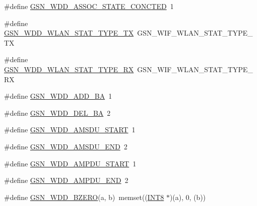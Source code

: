 \begin{DoxyCompactItemize}
\#define \hyperlink{a00603_af6d374ed7ee7ba0272cf307e24b1042d}{GSN\_\-WDD\_\-ASSOC\_\-STATE\_\-CONCTED}~1
\item 
\#define \hyperlink{a00603_a8487e8e5eda472ed8392357a081358f2}{GSN\_\-WDD\_\-WLAN\_\-STAT\_\-TYPE\_\-TX}~GSN\_\-WIF\_\-WLAN\_\-STAT\_\-TYPE\_\-TX
\item 
\#define \hyperlink{a00603_a3a8f4b4eca7723415ea145f12e4e2dbd}{GSN\_\-WDD\_\-WLAN\_\-STAT\_\-TYPE\_\-RX}~GSN\_\-WIF\_\-WLAN\_\-STAT\_\-TYPE\_\-RX
\item 
\#define \hyperlink{a00603_aaa7df45acb072b8008bb24b3e5a8e8b9}{GSN\_\-WDD\_\-ADD\_\-BA}~1
\item 
\#define \hyperlink{a00603_a8e1bde26ba2df3e5ae166d325eab08fd}{GSN\_\-WDD\_\-DEL\_\-BA}~2
\item 
\#define \hyperlink{a00603_a12348d97f30d004b6b377f53be35af6b}{GSN\_\-WDD\_\-AMSDU\_\-START}~1
\item 
\#define \hyperlink{a00603_a22a45b0beca366e846d2a88a1dba6777}{GSN\_\-WDD\_\-AMSDU\_\-END}~2
\item 
\#define \hyperlink{a00603_a78add8013309f477df4ce6fb69e28e5c}{GSN\_\-WDD\_\-AMPDU\_\-START}~1
\item 
\#define \hyperlink{a00603_a1ea4e46accb95280634fb24898502942}{GSN\_\-WDD\_\-AMPDU\_\-END}~2
\item 
\#define \hyperlink{a00603_a630663c7d7bce1461f01614edbcef81e}{GSN\_\-WDD\_\-BZERO}(a, b)~memset((\hyperlink{a00660_ga307b8734c020247f6bac4fcde0dcfbb9}{INT8} $\ast$)(a), 0, (b))
\end{DoxyCompactItemize}
